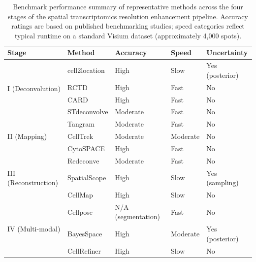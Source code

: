\begin{table}[htbp]
\centering
\caption{Benchmark performance summary of representative methods across the four stages of the spatial transcriptomics resolution enhancement pipeline. Accuracy ratings are based on published benchmarking studies; speed categories reflect typical runtime on a standard Visium dataset (approximately 4,000 spots).}
\label{tab:benchmark}
\begin{tabular}{@{}lllll@{}}
\toprule
\textbf{Stage} & \textbf{Method} & \textbf{Accuracy} & \textbf{Speed} & \textbf{Uncertainty} \\
\midrule
\multirow{4}{*}{I (Deconvolution)}
& cell2location & High & Slow & Yes (posterior) \\
& RCTD & High & Fast & No \\
& CARD & High & Fast & No \\
& STdeconvolve & Moderate & Fast & No \\
\midrule
\multirow{3}{*}{II (Mapping)}
& Tangram & Moderate & Fast & No \\
& CellTrek & Moderate & Moderate & No \\
& CytoSPACE & High & Fast & No \\
\midrule
\multirow{3}{*}{III (Reconstruction)}
& Redeconve & Moderate & Fast & No \\
& SpatialScope & High & Slow & Yes (sampling) \\
& CellMap & High & Slow & No \\
\midrule
\multirow{3}{*}{IV (Multi-modal)}
& Cellpose & N/A (segmentation) & Fast & No \\
& BayesSpace & High & Moderate & Yes (posterior) \\
& CellRefiner & High & Slow & No \\
\bottomrule
\end{tabular}
\end{table}
